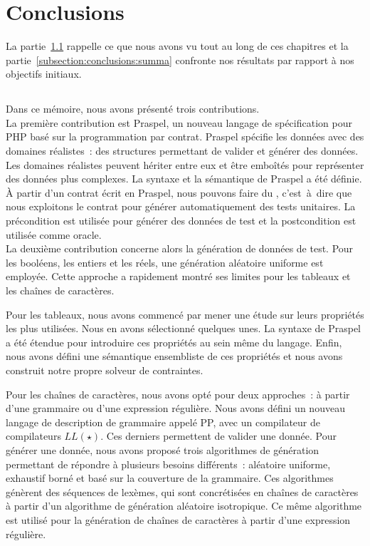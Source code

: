 \section{Conclusions}
\label{section:conclusions:conclusions}

La partie~\ref{subsection:conclusions:recapitulare} rappelle ce que nous avons
vu tout au long de ces chapitres et la partie~\ref{subsection:conclusions:summa}
confronte nos résultats par rapport à nos objectifs initiaux.

\subsection{}
\label{subsection:conclusions:recapitulare}

Dans ce mémoire, nous avons présenté trois contributions. \\

La première contribution est Praspel, un nouveau langage de spécification pour
PHP basé sur la programmation par contrat. Praspel spécifie les données avec des
domaines réalistes~: des structures permettant de valider et générer des
données. Les domaines réalistes peuvent hériter entre eux et être emboîtés pour
représenter des données plus complexes. La syntaxe et la sémantique de Praspel a
été définie.  À partir d'un contrat écrit en Praspel, nous pouvons faire du
, c'est~à~dire que nous exploitons le contrat
pour générer automatiquement des tests unitaires. La précondition est utilisée
pour générer des données de test et la postcondition est utilisée comme oracle.
\\

La deuxième contribution concerne alors la génération de données de test. Pour
les booléens, les entiers et les réels, une génération aléatoire uniforme est
employée. Cette approche a rapidement montré ses limites pour les tableaux et
les chaînes de caractères.

Pour les tableaux, nous avons commencé par mener une étude sur leurs propriétés
les plus utilisées. Nous en avons sélectionné quelques unes. La syntaxe de
Praspel a été étendue pour introduire ces propriétés au sein même du langage.
Enfin, nous avons défini une sémantique ensembliste de ces propriétés et nous
avons construit notre propre solveur de contraintes.

Pour les chaînes de caractères, nous avons opté pour deux approches~: à partir
d'une grammaire ou d'une expression régulière. Nous avons défini un nouveau
langage de description de grammaire appelé PP, avec un compilateur de
compilateurs $LL(\star)$. Ces derniers permettent de valider une donnée. Pour
générer une donnée, nous avons proposé trois algorithmes de génération
permettant de répondre à plusieurs besoins différents~: aléatoire uniforme,
exhaustif borné et basé sur la couverture de la grammaire. Ces algorithmes
génèrent des séquences de lexèmes, qui sont concrétisées en chaînes de
caractères à partir d'un algorithme de génération aléatoire isotropique. Ce même
algorithme est utilisé pour la génération de chaînes de caractères à partir
d'une expression régulière.


